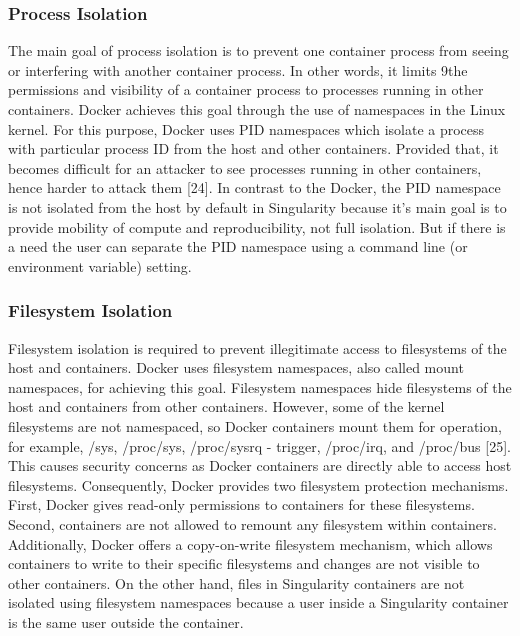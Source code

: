 \documentclass[a4paper,num-refs]{oup-contemporary}
\begin{document}
\subsubsection{Process Isolation}

The main goal of process isolation is to prevent one container process from
seeing or interfering with another container process. In other words, it limits
9the permissions and visibility of a container process to processes running in other
containers. Docker achieves this goal through the use of namespaces in the Linux
kernel. For this purpose, Docker uses PID namespaces which isolate a process
with particular process ID from the host and other containers. Provided that,
it becomes difficult for an attacker to see processes running in other containers,
hence harder to attack them [24]. In contrast to the Docker, the PID namespace
is not isolated from the host by default in Singularity because it’s main goal is
to provide mobility of compute and reproducibility, not full isolation. But if
there is a need the user can separate the PID namespace using a command line
(or environment variable) setting.

\subsubsection{Filesystem Isolation}

Filesystem isolation is required to prevent illegitimate access to filesystems of
the host and containers. Docker uses filesystem namespaces, also called mount
namespaces, for achieving this goal. Filesystem namespaces hide filesystems
of the host and containers from other containers. However, some of the kernel
filesystems are not namespaced, so Docker containers mount them for operation,
for example, /sys, /proc/sys, /proc/sysrq - trigger, /proc/irq, and /proc/bus
[25]. This causes security concerns as Docker containers are directly able to
access host filesystems. Consequently, Docker provides two filesystem protection
mechanisms. First, Docker gives read-only permissions to containers for these
filesystems. Second, containers are not allowed to remount any filesystem within
containers. Additionally, Docker offers a copy-on-write filesystem mechanism,
which allows containers to write to their specific filesystems and changes are not
visible to other containers. On the other hand, files in Singularity containers
are not isolated using filesystem namespaces because a user inside a Singularity
container is the same user outside the container.
\end{document}
